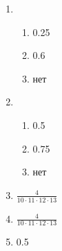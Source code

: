 \begin{enumerate}
	\item
			\begin{enumerate}
				\item 0.25
				\item 0.6
				\item нет
			\end{enumerate}
	\item
			\begin{enumerate}
				\item 0.5
				\item  0.75
				\item нет
			\end{enumerate}
	\item $\frac{4}{10 \cdot 11 \cdot 12 \cdot 13}$
	\item $\frac{4}{10 \cdot 11 \cdot 12 \cdot 13}$
	\item 0.5



\end{enumerate}
